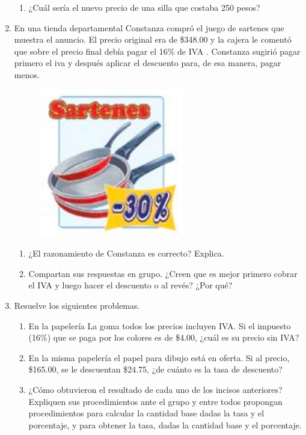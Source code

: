 \documentclass[11pt]{book}
\begin{document}
\begin{enumerate}
\begin{enumerate}
          \item ¿Cuál sería el nuevo precio de una silla que costaba 250 pesos?
        \end{enumerate}
  \item En una tienda departamental Constanza compró el juego de sartenes que muestra
        el anuncio. El precio original era de \$348.00 y la cajera le comentó que sobre el
        precio final debía pagar el 16\% de IVA . Constanza sugirió pagar primero el iva y
        después aplicar el descuento para, de esa manera, pagar menos.
        \begin{figure}[H]
          \centering
          \includegraphics[width=.3\linewidth]{sartenes.png}
          \label{fig:sartenes}
        \end{figure}
        \begin{enumerate}
          \item ¿El razonamiento de Constanza es correcto? Explica.
          \item Compartan sus respuestas en grupo. ¿Creen que es mejor primero cobrar el IVA y
                luego hacer el descuento o al revés? ¿Por qué?
        \end{enumerate}
  \item Resuelve los siguientes problemas.
        \begin{enumerate}
          \item En la papelería La goma todos los precios incluyen IVA. Si el impuesto
                (16\%) que se paga por los colores es de \$4.00, ¿cuál es su precio sin IVA?
          \item En la misma papelería el papel para dibujo está en oferta. Si al precio,
                \$165.00, se le descuentan \$24.75, ¿de cuánto es la tasa de descuento?

          \item ¿Cómo obtuvieron el resultado de cada uno de los incisos anteriores? Expliquen
                sus procedimientos ante el grupo y entre todos propongan procedimientos para
                calcular la cantidad base dadas la tasa y el porcentaje, y para obtener la tasa,
                dadas la cantidad base y el porcentaje.
        \end{enumerate}
\end{enumerate}
\end{document}
